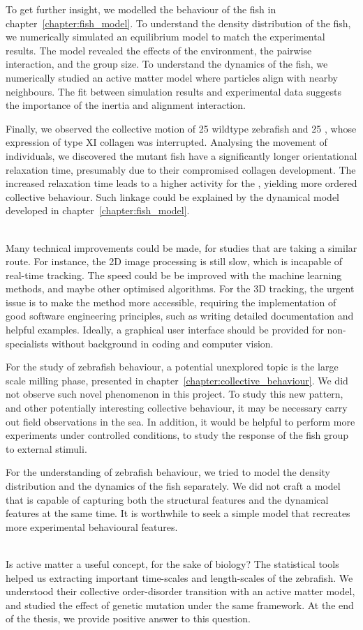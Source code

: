 \documentclass[11pt,twoside]{report}
\begin{document}
To get further insight, we modelled the behaviour of the fish in chapter~\ref{chapter:fish_model}. To understand the density distribution of the fish, we numerically simulated an equilibrium model to match the experimental results. The model revealed the effects of the environment, the pairwise interaction, and the group size. To understand the dynamics of the fish, we numerically studied an active matter model where particles align with nearby neighbours. The fit between simulation results and experimental data suggests the importance of the inertia and alignment interaction.

Finally, we observed the collective motion of 25 wildtype zebrafish and 25 {\mf}, whose expression of type XI collagen was interrupted. Analysing the movement of individuals, we discovered the mutant fish have a significantly longer orientational relaxation time, presumably due to their compromised collagen development. 
The increased relaxation time leads to a higher activity for the {\mf}, yielding more ordered collective behaviour. Such linkage could be explained by the dynamical model developed in chapter~\ref{chapter:fish_model}.

\;\\

Many technical improvements could be made, for studies that are taking a similar route. For instance, the 2D image processing is still slow, which is incapable of real-time tracking. The speed could be be improved with the machine learning methods, and maybe other optimised algorithms.
For the 3D tracking, the urgent issue is to make the method more accessible, requiring the implementation of good software engineering principles, such as writing detailed documentation and helpful examples. Ideally, a graphical user interface should be provided for non-specialists without background in coding and computer vision.

For the study of zebrafish behaviour, a potential unexplored topic is the large scale milling phase, presented in chapter~\ref{chapter:collective_behaviour}. We did not observe such novel phenomenon in this project. To study this new pattern, and other potentially interesting collective behaviour, it may be necessary carry out field observations in the sea. In addition, it would be helpful to perform more experiments under controlled conditions, to study the response of the fish group to external stimuli.

For the understanding of zebrafish behaviour, we tried to model the density distribution and the dynamics of the fish separately. We did not craft a model that is capable of capturing both the structural features and the dynamical features at the same time. It is worthwhile to seek a simple model that recreates more experimental behavioural features.

\;\\

Is active matter a useful concept, for the sake of biology? The statistical tools helped us extracting important time-scales and length-scales of the zebrafish. We understood their collective order-disorder transition with an active matter model, and studied the effect of genetic mutation under the same framework. At the end of the thesis, we provide positive answer to this question.
\end{document}
